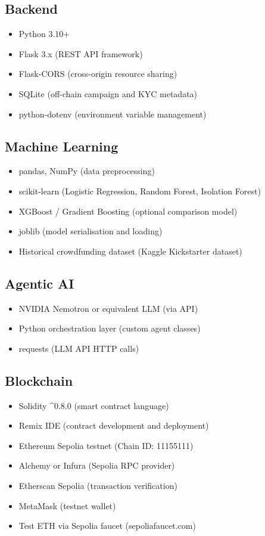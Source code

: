 \subsection{Backend}
\begin{itemize}
    \item Python 3.10+
    \item Flask 3.x (REST API framework)
    \item Flask-CORS (cross-origin resource sharing)
    \item SQLite (off-chain campaign and KYC metadata)
    \item python-dotenv (environment variable management)
\end{itemize}

\subsection{Machine Learning}
\begin{itemize}
    \item pandas, NumPy (data preprocessing)
    \item scikit-learn (Logistic Regression, Random Forest, Isolation Forest)
    \item XGBoost / Gradient Boosting (optional comparison model)
    \item joblib (model serialisation and loading)
    \item Historical crowdfunding dataset (Kaggle Kickstarter dataset)
\end{itemize}

\subsection{Agentic AI}
\begin{itemize}
    \item NVIDIA Nemotron or equivalent LLM (via API)
    \item Python orchestration layer (custom agent classes)
    \item requests (LLM API HTTP calls)
\end{itemize}

\subsection{Blockchain}
\begin{itemize}
    \item Solidity \^{}0.8.0 (smart contract language)
    \item Remix IDE (contract development and deployment)
    \item Ethereum Sepolia testnet (Chain ID: 11155111)
    \item Alchemy or Infura (Sepolia RPC provider)
    \item Etherscan Sepolia (transaction verification)
    \item MetaMask (testnet wallet)
    \item Test ETH via Sepolia faucet (sepoliafaucet.com)
\end{itemize}

